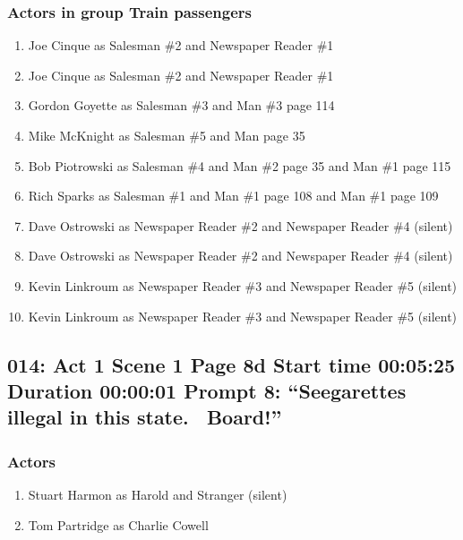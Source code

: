 \subsubsection{Actors in group Train passengers}
\begin{enumerate}
\item Joe Cinque as Salesman \#2 and Newspaper Reader \#1
\item Joe Cinque as Salesman \#2 and Newspaper Reader \#1
\item Gordon Goyette as Salesman \#3 and Man \#3 page 114
\item Mike McKnight as Salesman \#5 and Man page 35
\item Bob Piotrowski as Salesman \#4 and Man \#2 page 35 and Man \#1 page 115
\item Rich Sparks as Salesman \#1 and Man \#1 page 108 and Man \#1 page 109
\item Dave Ostrowski as Newspaper Reader \#2 and Newspaper Reader \#4 (silent)
\item Dave Ostrowski as Newspaper Reader \#2 and Newspaper Reader \#4 (silent)
\item Kevin Linkroum as Newspaper Reader \#3 and Newspaper Reader \#5 (silent)
\item Kevin Linkroum as Newspaper Reader \#3 and Newspaper Reader \#5 (silent)
\end{enumerate}


\subsection{014: Act 1 Scene 1 Page 8d Start time 00:05:25 Duration 00:00:01 Prompt 8: ``Seegarettes illegal in this state.~ Board!''}

\subsubsection{Actors}
\begin{enumerate}
\item Stuart Harmon as Harold and Stranger (silent)
\item Tom Partridge as Charlie Cowell
\end{enumerate}
